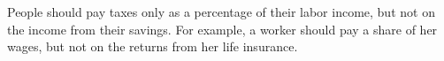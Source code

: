 People should pay taxes only as a percentage of their labor income, but not on the income from their savings. For example, a worker should pay a share of her wages, but not on the returns from her life insurance.
